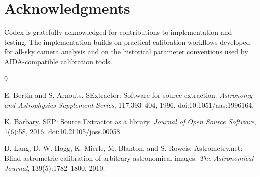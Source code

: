 \documentclass[11pt]{article}
\begin{document}
\section*{Acknowledgments}

Codex is gratefully acknowledged for contributions to implementation and
testing. The implementation builds on practical calibration workflows developed
for all-sky camera analysis and on the historical parameter conventions used by
AIDA-compatible calibration tools.

\begin{thebibliography}{9}

E. Bertin and S. Arnouts.
\newblock SExtractor: Software for source extraction.
\newblock \emph{Astronomy and Astrophysics Supplement Series}, 117:393--404,
1996.
\newblock doi:10.1051/aas:1996164.

K. Barbary.
\newblock SEP: Source Extractor as a library.
\newblock \emph{Journal of Open Source Software}, 1(6):58, 2016.
\newblock doi:10.21105/joss.00058.

D. Lang, D. W. Hogg, K. Mierle, M. Blanton, and S. Roweis.
\newblock Astrometry.net: Blind astrometric calibration of arbitrary
astronomical images.
\newblock \emph{The Astronomical Journal}, 139(5):1782--1800, 2010.

\end{thebibliography}
\end{document}
